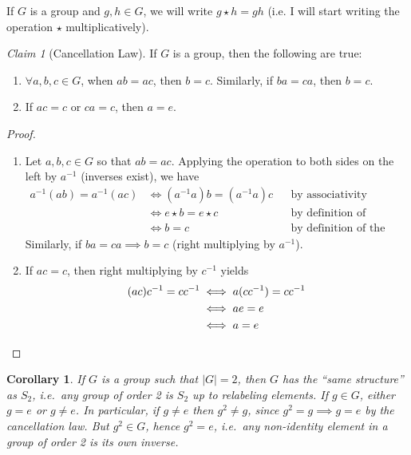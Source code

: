 \documentclass[12pt,letterpaper,DIV=11,final]{scrartcl}
\theoremstyle{plain}
\newtheorem{corollary}{Corollary}
\theoremstyle{definition}
\theoremstyle{remark}
\newtheorem{claim}{Claim}
\begin{document}
If $G$ is a group and $g, h \in G$, we will write $g \star h = gh$ (i.e. I will start writing the operation $\star$ multiplicatively).

\begin{claim}[Cancellation Law]
  If $G$ is a group, then the following are true:
  \begin{enumerate}
    \item $\forall a, b, c \in G$, when $ab = ac$, then $b = c$.
      Similarly, if $ba = ca$, then $b = c$.
    \item If $ac = c$ or $ca = c$, then $a = e$.
  \end{enumerate}

  \begin{proof}\leavevmode
    \begin{enumerate}
      \item Let $a, b, c \in G$ so that $ab = ac$.
        Applying the operation to both sides on the left by $a^{-1}$ (inverses exist), we have
        \begin{align*}
          a^{-1}(ab) = a^{-1}(ac) &\iff (a^{-1} a) b = (a^{-1} a) c && \text{by associativity} \\
                                  &\iff e \star b = e \star c       && \text{by definition of inverses} \\
                                  &\iff b = c                       && \text{by definition of the identity element}
        \end{align*}
        Similarly, if $ba = ca \implies b = c$ (right multiplying by $a^{-1}$).

      \item If $ac = c$, then right multiplying by $c^{-1}$ yields
        \begin{align*}
          (ac) c^{-1} = c c^{-1} &\iff a(c c^{-1}) = c c^{-1} \\
                                 &\iff ae = e \\
                                 &\iff a = e \qedhere
        \end{align*}
    \end{enumerate}
  \end{proof}
\end{claim}

\begin{corollary}
  If $G$ is a group such that $|G| = 2$, then $G$ has the \enquote{same structure} as $S_2$, i.e.\ any group of order 2 is $S_2$ up to relabeling elements.
  If $g \in G$, either $g = e$ or $g \neq e$.
  In particular, if $g \neq e$ then $g^2 \neq g$, since $g^2 = g \implies g = e$ by the cancellation law.
  But $g^2 \in G$, hence $g^2 = e$, i.e.\ any non-identity element in a group of order 2 is its own inverse.
\end{corollary}
\end{document}
